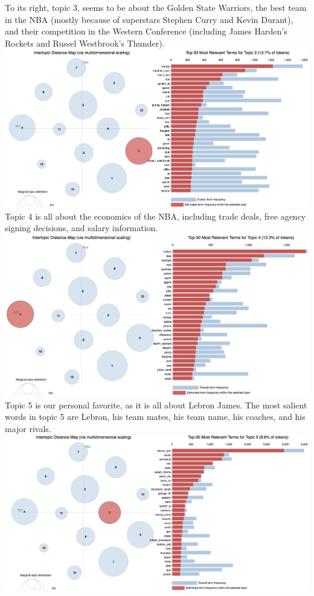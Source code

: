 \documentclass[11pt]{article}
\begin{document}
To its right, topic 3, seems to be about the Golden State Warriors, the best team in the NBA (mostly because of superstars Stephen Curry and Kevin Durant), and their competition in the Western Conference (including James Harden's Rockets and Russel Westbrook's Thunder). 
\includegraphics[width=400pt]{3.png} \\

Topic 4 is all about the economics of the NBA, including trade deals, free agency signing decisions, and salary information.
\includegraphics[width=400pt]{4.png} \\

Topic 5 is our personal favorite, as it is all about Lebron James.  The most salient words in topic 5 are Lebron, his team mates, his team name, his coaches, and his major rivals.  
\includegraphics[width=400pt]{5.png} \\
\end{document}
